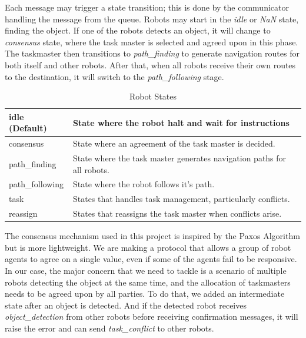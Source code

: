 \newpage

Each message may trigger a state transition; this is done by the communicator handling the message from the queue. Robots may start in the \textit{idle} or \textit{NaN} state, finding the object. If one of the robots detects an object, it will change to \textit{consensus} state, where the task master is selected and agreed upon in this phase. The taskmaster then transitions to \textit{path\_finding} to generate navigation routes for both itself and other robots. After that, when all robots receive their own routes to the destination, it will switch to the \textit{path\_following} stage.

\begin{table}[ht]
\centering
\begin{tabular}{|p{3cm}|p{12cm}|}
\hline
 idle (Default) & State where the robot halt and wait for instructions\\ \hline
 consensus & State where an agreement of the task master is decided.\\ \hline
 path\_finding & State where the task master generates navigation paths for all robots.\\ \hline
 path\_following &  State where the robot follows it's path.\\ \hline
 task & States that handles task management, particularly conflicts.\\ \hline
 reassign & States that reassigns the task master when conflicts arise.\\ \hline
\end{tabular}
\caption{Robot States}
\end{table}

The consensus mechanism used in this project is inspired by the Paxos Algorithm but is more lightweight. We are making a protocol that allows a group of robot agents to agree on a single value, even if some of the agents fail to be responsive. In our case, the major concern that we need to tackle is a scenario of multiple robots detecting the object at the same time, and the allocation of taskmasters needs to be agreed upon by all parties. To do that, we added an intermediate state after an object is detected. And if the detected robot receives \textit{object\_detection} from other robots before receiving confirmation messages, it will raise the error and can send \textit{task\_conflict} to other robots.

